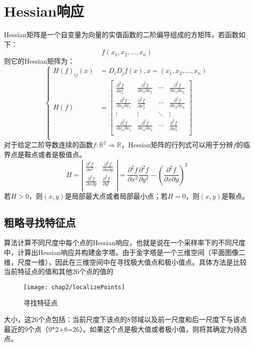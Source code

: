   \section{Hessian响应}
    Hessian矩阵是一个自变量为向量的实值函数的二阶偏导组成的方矩阵，若函数如下：
    \begin{equation}
      f(x_1,x_2,\ldots,x_n)
    \end{equation}
    则它的Hessian矩阵为：
    \begin{equation}
    \begin{cases}
      H(f)_{ij}(x) & =D_iD_jf(x), x =(x_1,x_2,\ldots,x_n) \\
      H(f) & =\left[\begin{array}{cccc}
      \frac{\partial^2f}{\partial x_1^2} & \frac{\partial^2f}{\partial x_1 \partial x_2} & \cdots & \frac{\partial^2f}{\partial x_1 \partial x_n} \\
      \frac{\partial^2f}{\partial x_2 \partial x_1} & \frac{\partial^2f}{\partial x_2^2} & \cdots & \frac{\partial^2f}{\partial x_2 \partial x_n} \\
      \vdots & \vdots & \ddots & \vdots \\
      \frac{\partial^2f}{\partial x_n \partial x_1} & \frac{\partial^2f}{\partial x_n \partial x_2} & \cdots & \frac{\partial^2f}{\partial x_n^2} \\
      \end{array}\right] \\
    \end{cases}
    \end{equation}
    对于给定二阶导数连续的函数$f:\mathbb{R}^2\Rightarrow\mathbb{R}$，Hessian矩阵的行列式可以用于分辨$f$的临界点是鞍点或者是极值点。
    \begin{equation}
      H=\left|\begin{array}{cc}
      \frac{\partial^2f}{\partial x^2} & \frac{\partial^2f}{\partial x\partial y} \\
      \frac{\partial^2f}{\partial x\partial y} & \frac{\partial^2f}{\partial y^2} \\
      \end{array}\right|
      =\frac{\partial^2f}{\partial x^2}\frac{\partial^2f}{\partial y^2}-(\frac{\partial^2f}{\partial x \partial y})^2
    \end{equation}
    若$H>0$，则$(x,y)$是局部最大点或者局部最小点；若$H=0$，则$(x,y)$是鞍点。
    \subsection{粗略寻找特征点} 
      算法计算不同尺度中每个点的Hessian响应，也就是说在一个采样率下的不同尺度中，计算出Hessian响应并构建金字塔。由于金字塔是一个三维空间（平面图像二维，尺度一维），因此在三维空间中在寻找极大值点和极小值点。具体方法是比较当前特征点的值和其他26个点的值的\begin{wrapfigure}{r}{0.35\textwidth}
        \centering
        \texttt{[image: chap2/localizePoints]}
        \caption{寻找特征点}
      \end{wrapfigure}大小，这26个点包括：当前尺度下该点的8邻域以及前一尺度和后一尺度下与该点最近的9个点（9*2+8=26）。如果这个点是极大值或者极小值，则将其确定为待选点。
